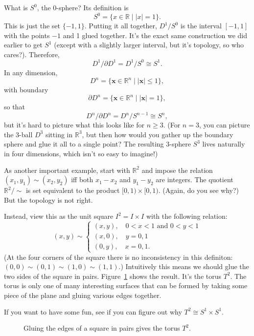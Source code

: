 \documentclass[12pt]{article}
\begin{document}
What is $S^{0}$, the 0-sphere? Its definition is
\[
	S^{0} = \{ x \in \mathbb{R} \mid |x| = 1\}.
\]
This is just the set $\{-1, 1\}$. Putting it all together, $D^{1}/S^{0}$ is the interval $[-1, 1]$ with the points $-1$ and 1 glued together. It's the exact same construction we did earlier to get $S^{1}$ (except with a slightly larger interval, but it's topology, so who cares?). Therefore,
\[
	D^{1}/\partial D^{1} = D^{1}/S^{0} \cong S^{1}.
\]
In any dimension,
\[
	D^{n} = \{\mathbf{x} \in \mathbb{R}^{n} \mid | \mathbf{x} | \leq 1\},
\]
with boundary
\[
	\partial D^{n} = \{\mathbf{x} \in \mathbb{R}^{n} \mid | \mathbf{x} | = 1\},
\]
so that
\[
	D^{n}/\partial D^{n} = D^{n}/S^{n-1} \cong S^{n},
\]
but it's hard to picture what this looks like for $n \geq 3$. (For $n = 3$, you can picture the 3-ball $D^{3}$ sitting in $\mathbb{R}^{3}$, but then how would you gather up the boundary sphere and glue it all to a single point? The resulting 3-sphere $S^{3}$ lives naturally in four dimensions, which isn't so easy to imagine!)

As another important example, start with $\mathbb{R}^{2}$ and impose the relation $(x_{1}, y_{1}) \sim (x_{2}, y_{2})$ iff both $x_{1} - x_{2}$ and $y_{1} - y_{2}$ are integers. The quotient $\mathbb{R}^{2}/\!\sim$ is set equivalent to the product $[0,1) \times [0,1)$. (Again, do you see why?) But the topology is not right.

Instead, view this as the unit square $I^{2} = I \times I$ with the following relation:
\[
	(x,y) \sim
    \begin{cases}
    	(x, y), \quad 0 < x < 1 \text{ and }
        	0 < y < 1 \\
        (x, 0), \quad y = 0, 1 \\
        (0, y), \quad x = 0, 1.
    \end{cases}
\]
(At the four corners of the square there is no inconsistency in this definiton: $(0,0) \sim (0, 1) \sim (1, 0) \sim (1,1)$.) Intuitively this means we should glue the two sides of the square in pairs. Figure~\ref{F:torus} shows the result. It's the torus $T^{2}$. The torus is only one of many interesting surfaces that can be formed by taking some piece of the plane and gluing various edges together.

If you want to have some fun, see if you can figure out why $T^{2} \cong S^{1} \times S^{1}$.

\begin{figure}[ht]
\centering

\caption{Gluing the edges of a square in pairs gives the torus $T^{2}$.}
\label{F:torus}
\end{figure}
\end{document}
